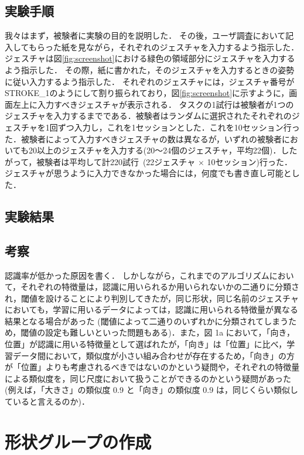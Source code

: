 \subsection{実験手順}
我々はまず，被験者に実験の目的を説明した．
その後，ユーザ調査において記入してもらった紙を見ながら，それぞれのジェスチャを入力するよう指示した．
ジェスチャは図\ref{fig:screenshot}における緑色の領域部分にジェスチャを入力するよう指示した．
その際，紙に書かれた，そのジェスチャを入力するときの姿勢に従い入力するよう指示した．
それぞれのジェスチャには，ジェスチャ番号がSTROKE\_1のようにして割り振られており，図\ref{fig:screenshot}に示すように，画面左上に入力すべきジェスチャが表示される．
タスクの1試行は被験者が1つのジェスチャを入力するまでである．被験者はランダムに選択されたそれぞれのジェスチャを1回ずつ入力し，これを1セッションとした．これを10セッション行った．被験者によって入力すべきジェスチャの数は異なるが，いずれの被験者においても20以上のジェスチャを入力する(20〜24個のジェスチャ，平均22個)．したがって，被験者は平均して計220試行~(22ジェスチャ $\times$ 10セッション)行った．
ジェスチャが思うように入力できなかった場合には，何度でも書き直し可能とした．

\subsection{実験結果}


\subsection{考察}
認識率が低かった原因を書く．
しかしながら，これまでのアルゴリズムにおいて，それぞれの特徴量は，認識に用いられるか用いられないかの二通りに分類され，閾値を設けることにより判別してきたが，同じ形状，同じ名前のジェスチャにおいても，学習に用いるデータによっては，認識に用いられる特徴量が異なる結果となる場合があった (閾値によって二通りのいずれかに分類されてしまうため，閾値の設定も難しいといった問題もある)．また，図 1a において，「向き，位置」が認識に用いる特徴量として選ばれたが，「向き」は「位置」に比べ，学習データ間において，類似度が小さい組み合わせが存在するため，「向き」の方が「位置」よりも考慮されるべきではないのかという疑問や，それぞれの特徴量による類似度を，同じ尺度において扱うことができるのかという疑問があった (例えば，「大きさ」の類似度 0.9 と「向き」の類似度 0.9 は，同じくらい類似していると言えるのか)．

\section{形状グループの作成}




